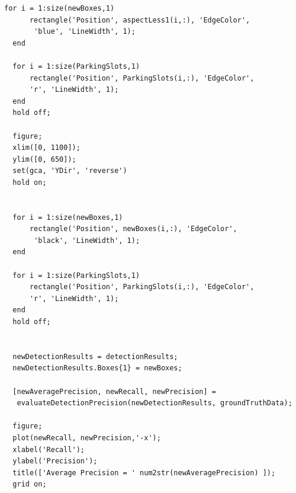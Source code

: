 \documentclass[man]{apa7}
\begin{document}
\begin{lstlisting}[]
  for i = 1:size(newBoxes,1)
      rectangle('Position', aspectLess1(i,:), 'EdgeColor',
       'blue', 'LineWidth', 1);
  end
  
  for i = 1:size(ParkingSlots,1)
      rectangle('Position', ParkingSlots(i,:), 'EdgeColor', 
      'r', 'LineWidth', 1);
  end
  hold off;
  
  figure;
  xlim([0, 1100]);
  ylim([0, 650]);
  set(gca, 'YDir', 'reverse')
  hold on;
  
  
  for i = 1:size(newBoxes,1)
      rectangle('Position', newBoxes(i,:), 'EdgeColor',
       'black', 'LineWidth', 1);
  end
  
  for i = 1:size(ParkingSlots,1)
      rectangle('Position', ParkingSlots(i,:), 'EdgeColor', 
      'r', 'LineWidth', 1);
  end
  hold off;
  
  
  newDetectionResults = detectionResults;
  newDetectionResults.Boxes{1} = newBoxes;
  
  [newAveragePrecision, newRecall, newPrecision] =
   evaluateDetectionPrecision(newDetectionResults, groundTruthData);
  
  figure;
  plot(newRecall, newPrecision,'-x');
  xlabel('Recall');
  ylabel('Precision');
  title(['Average Precision = ' num2str(newAveragePrecision) ]);
  grid on;

\end{lstlisting}
\end{document}
